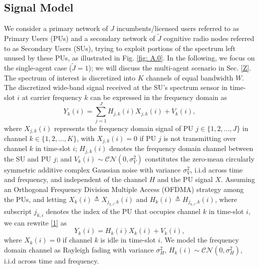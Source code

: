 \documentclass[12pt, draftcls, onecolumn]{IEEEtran}
\begin{document}
\subsection{Signal Model}\label{I.I}
We consider a primary network of $J$ incumbents/licensed users referred to as Primary Users (PUs) and a secondary network of $\tilde J$ cognitive radio nodes referred to as Secondary Users (SUs), trying to exploit portions of the spectrum left unused by these PUs, as illustrated in Fig. \ref{fig: A.0}. In the following, we focus on the single-agent case ($\tilde J=1$); we will discuss the multi-agent scenario in Sec. \ref{Z}. The spectrum of interest is discretized into $K$ channels of equal bandwidth $W$. The discretized wide-band signal received at the SU's spectrum sensor in time-slot $i$ at carrier frequency $k$ can be expressed in the frequency domain as
\begin{equation}\label{1}
    Y_{k}(i)=\sum_{j{=}1}^{J}{H_{j,k}(i)X_{j,k}(i)+V_{k}(i)},
\end{equation}
where $X_{j,k}(i)$ represents the frequency domain signal of PU $j{\in}\{1,2,\dots,J\}$ in channel $k \in \{1,2,\dots,K\}$, with $X_{j,k}(i){=}0$ if PU $j$ is not transmitting over channel $k$ in time-slot $i$; $H_{j,k}(i)$ denotes the frequency domain channel between the SU and PU $j$; and $V_{k}(i){\sim}\mathcal{CN}(0,\sigma_{V}^{2})$ constitutes the zero-mean circularly symmetric additive complex Gaussian noise with variance $\sigma_{V}^{2}$, i.i.d across time and frequency, and independent of the channel $H$ and the PU signal $X$. Assuming an Orthogonal Frequency Division Multiple Access (OFDMA) strategy among the PUs, and letting $X_{k}(i){\triangleq}X_{j_{k,i},k}(i)$ and $H_{k}(i){\triangleq}H_{j_{k,i},k}(i)$, where subscript $j_{k,i}$ denotes the index of the PU that occupies channel $k$ in time-slot $i$, we can rewrite \eqref{1} as
\begin{equation}\label{2}
    Y_{k}(i)=H_{k}(i)X_{k}(i)+V_{k}(i),
\end{equation}
where $X_{k}(i){=}0$ if channel $k$ is idle in time-slot $i$. We model the frequency domain channel as Rayleigh fading with variance $\sigma_{H}^{2}$, $H_{k}(i) \sim \mathcal{CN}(0,\sigma_{H}^{2})$, i.i.d across time and frequency.
\end{document}
